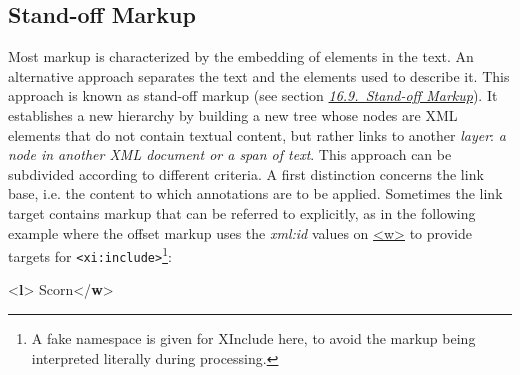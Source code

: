 \subsection[{Stand-off Markup}]{Stand-off Markup}\label{NHSO}\par
Most markup is characterized by the embedding of elements in the text. An alternative approach separates the text and the elements used to describe it. This approach is known as stand-off markup (see section \textit{\hyperref[SASO]{16.9.\ Stand-off Markup}}). It establishes a new hierarchy by building a new tree whose nodes are XML elements that do not contain textual content, but rather links to another \textit{layer}:  \textit{a node in another XML document or a span of text}. This approach can be subdivided according to different criteria. A first distinction concerns the link base, i.e. the content to which annotations are to be applied. Sometimes the link target contains markup that can be referred to explicitly, as in the following example where the offset markup uses the {\itshape xml:id} values on \hyperref[TEI.w]{<w>} to provide targets for \texttt{<xi:include>}\footnote{A fake namespace is given for XInclude here, to avoid the markup being interpreted literally during processing.}: \par\bgroup{}\exampleFont \begin{shaded}\noindent\mbox{}{<\textbf{l}>}\mbox{}\newline 
{}Scorn{</\textbf{w}>}\mbox{}\newline 

\end{shaded}
